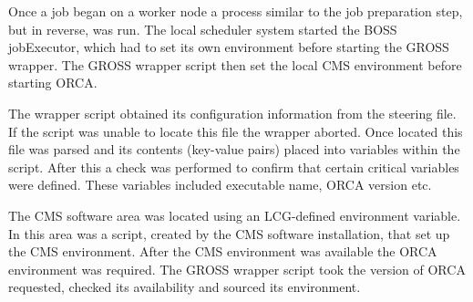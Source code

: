 

Once a job began on a worker node a process similar to the job preparation step, but in reverse, was run. The local scheduler system started the BOSS jobExecutor, which had to set its own environment before starting the GROSS wrapper. The GROSS wrapper script then set the local CMS environment before starting ORCA. 


The wrapper script obtained its configuration information from the steering file. If the script was unable to locate this file the wrapper aborted. Once located this file was parsed and its contents (key-value pairs) placed into variables within the script. After this a check was performed to confirm that certain critical variables were defined. These variables included executable name, ORCA version etc.

The CMS software area was located using an LCG-defined environment variable. In this area was a script, created by the CMS software installation, that set up the CMS environment. After the CMS environment was available the ORCA environment was required. The GROSS wrapper script took the version of ORCA requested, checked its availability and sourced its environment.

